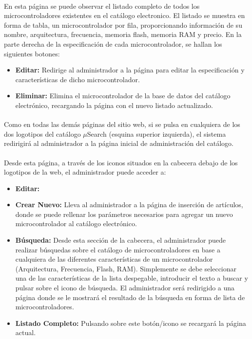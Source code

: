 \paragraph{}En esta página se puede observar el listado completo de todos los microcontroladores existentes en el catálogo electronico. El listado se muestra en forma de tabla, un microcontrolador por fila, proporcionando información de su nombre, arquitectura, frecuencia, memoria flash, memoria RAM y precio. En la parte derecha de la especificación de cada microcontrolador, se hallan los siguientes botones:
\begin{itemize}
	\item \textbf{Editar:} Redirige al administrador a la página para editar la especificación y características de dicho microcontrolador.
	\item \textbf{Eliminar:} Elimina el microcontrolador de la base de datos del catálogo electrónico, recargando la página con el nuevo listado actualizado.
\end{itemize}

\paragraph{}Como en todas las demás páginas del sitio web, si se pulsa en cualquiera de los dos logotipos del catálogo $\mu$Search (esquina superior izquierda), el sistema redirigirá al administrador a la página inicial de administración del catálogo.

\paragraph{}Desde esta página, a través de los iconos situados en la cabecera debajo de los logotipos de la web, el administrador puede acceder a:

\begin{itemize}
	\item \textbf{Editar:}
	
	\item \textbf{Crear Nuevo:} Lleva al administrador a la página de inserción de artículos, donde se puede rellenar los parámetros necesarios para agregar un nuevo microcontrolador al catálogo electrónico.

	\item \textbf{Búsqueda:} Desde esta sección de la cabecera, el administrador puede realizar búsquedas sobre el catálogo de microcontroladores en base a cualquiera de las diferentes características de un microcontrolador (Arquitectura, Frecuencia, Flash, RAM). Simplemente se debe seleccionar una de las características de la lista despegable, introducir el texto a buscar y pulsar sobre el icono de búsqueda.
	El administrador será redirigido a una página donde se le mostrará el resultado de la búsqueda en forma de lista de microcontroladores.
			
	\item \textbf{Listado Completo:} Pulsando sobre este botón/icono se recargará la página actual.
\end{itemize}